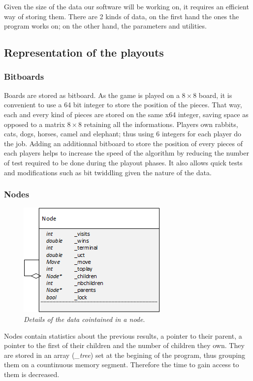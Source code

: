 Given the size of the data our software will be working on, it requires an efficient way of storing them. There are 2 kinds of data, on the first hand the ones the program works on; on the other hand, the parameters and utilities.
\subsection{Representation of the playouts}
\subsubsection{Bitboards}
Boards are stored as bitboard. As the game is played on a \ensuremath{8\times8} board, it is convenient to use a 64 bit integer to store the position of the pieces. That way, each and every kind of pieces are stored on the same x64 integer, saving space as opposed to a matrix \ensuremath{8\times8} retaining all the informations. Players own rabbits, cats, dogs, horses, camel and elephant; thus using 6 integers for each player do the job. Adding an additionnal bitboard to store the position of every pieces of each players helps to increase the speed of the algorithm by reducing the number of test required to be done during the playout phases. It also allows quick tests and modifications such as bit twiddling given the nature of the data.

\subsubsection{Nodes}
\begin{figure}[H] 
\centerline{\includegraphics[scale=0.8]{Data_Structure/Img/Node.png}}
\caption{\label{fig:nodedetails}\textit{Details of the data cointained in a node}.}
\end{figure}
Nodes contain statistics about the previous results, a pointer to their parent, a pointer to the first of their children and the number of children they own. They are stored in an array (\textit{\_tree}) set at the begining of the program, thus grouping them on a countinuous memory segment. Therefore the time to gain access to them is decreased.


